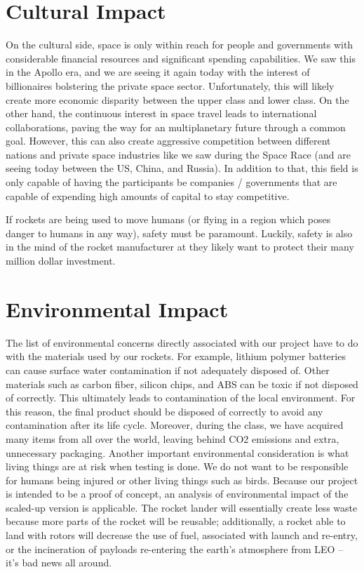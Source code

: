 \section{Cultural Impact}
On the cultural side, space is only within reach for people and governments with considerable financial resources and significant spending capabilities. We saw this in the Apollo era, and we are seeing it again today with the interest of billionaires bolstering the private space sector. Unfortunately, this will likely create more economic disparity between the upper class and lower class. On the other hand, the continuous interest in space travel leads to international collaborations, paving the way for an multiplanetary future through a common goal. However, this can also create aggressive competition between different nations and private space industries like we saw during the Space Race (and are seeing today between the US, China, and Russia). In addition to that, this field is only capable of having the participants be companies / governments that are capable of expending high amounts of capital to stay competitive. 

If  rockets are being used to move humans (or flying in a region which poses danger to humans in any way), safety must be paramount. Luckily, safety is also in the mind of the rocket manufacturer at they likely want to protect their many million dollar investment. 

\section{Environmental Impact}
The list of environmental concerns directly associated with our project have to do with the materials used by our rockets. For example, lithium polymer batteries can cause surface water contamination if not adequately disposed of. Other materials such as carbon fiber, silicon chips, and ABS can be toxic if not disposed of correctly. This ultimately leads to contamination of the local environment. For this reason, the final product should be disposed of correctly to avoid any contamination after its life cycle. Moreover, during the class, we have acquired many items from all over the world, leaving behind CO2 emissions and extra, unnecessary packaging. Another important environmental consideration is what living things are at risk when testing is done. We do not want to be responsible for humans being injured or other living things such as birds. Because our project is intended to be a proof of concept, an analysis of environmental impact of the scaled-up version is applicable. The rocket lander will essentially create less waste because more parts of the rocket will be reusable; additionally, a rocket able to land with rotors will decrease the use of fuel, associated with launch and re-entry, or the incineration of payloads re-entering the earth’s atmosphere from LEO – it’s bad news all around.

